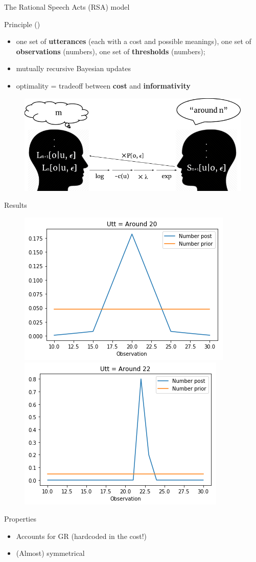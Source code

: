 \documentclass[xcolor=table, hyperref={pdfpagelabels=false}]{beamer}
\begin{document}
\begin{frame}{The Rational Speech Acts (RSA) model}
\begin{block}{Principle (\cite{lassiter2013,bergen2016})}\pause
	\begin{itemize}
		\item one set of \textbf{utterances} (each with a cost and possible meanings), one set of \textbf{observations} (numbers), one set of \textbf{thresholds} (numbers); \pause
		\item mutually recursive Bayesian updates \pause
		\item optimality = tradeoff between \textbf{cost} and \textbf{informativity}
	\end{itemize}
\end{block}
\begin{figure}
	\includegraphics[width=.8\textwidth]{./images/rsa.png}
\end{figure}
\end{frame}

\begin{frame}{Results}
\begin{figure}
	\includegraphics[width=.45\textwidth]{./images/bilateral_around_20_number.png}
	\includegraphics[width=.45\textwidth]{./images/bilateral_around_22_number.png}
\end{figure}\pause
\begin{block}{Properties}
	\begin{itemize}
		\item Accounts for GR (hardcoded in the cost!)\pause
		\item (Almost) symmetrical
	\end{itemize}
\end{block}
\end{frame}
\end{document}
